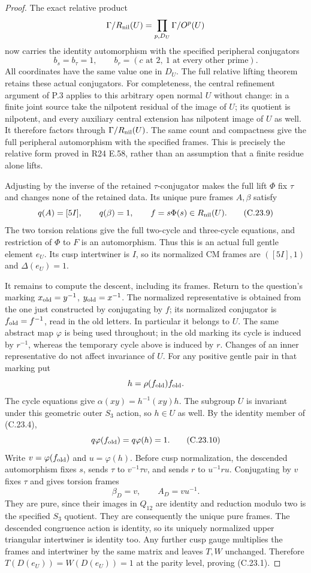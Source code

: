 \begin{proof}
The exact relative product
\[
 \Gamma/R_{\rm nil}(U)
       =\prod_{p,D_U}\Gamma/O^p(U)
\]
now carries the identity automorphism with the
specified peripheral conjugators
\[
 b_s=b_\tau=1,\qquad
 b_r=(c\text{ at }2,\ 1\text{ at every other prime}).
 \tag{C.23.8}
\]
All coordinates have the same value one in $D_U$.
The full relative lifting theorem retains these
actual conjugators. For completeness, the central
refinement argument of P.3 applies to this arbitrary
open normal $U$ without change: in a finite joint
source take the nilpotent residual of the image of
$U$; its quotient is nilpotent, and every auxiliary
central extension has nilpotent image of $U$ as
well. It therefore factors through
$\Gamma/R_{\rm nil}(U)$. The same count and
compactness give the full peripheral automorphism
with the specified frames. This is precisely the
relative form proved in R24 E.58, rather than an
assumption that a finite residue alone lifts.

Adjusting by the inverse of the retained
$\tau$-conjugator makes the full lift $\Phi$
fix $\tau$ and changes none of the retained data.
Its unique pure frames $A,\beta$ satisfy
\[
       q(A)=[5I],\qquad q(\beta)=1,
       \qquad f=s\Phi(s)\in R_{\rm nil}(U).
 \tag{C.23.9}
\]
The two torsion relations give the full two-cycle
and three-cycle equations, and restriction of
$\Phi$ to $F$ is an automorphism. Thus this is
an actual full gentle element $e_U$. Its cusp
intertwiner is $I$, so its normalized CM frames
are $([5I],1)$ and $\Delta(e_U)=1$.

It remains to compute the descent, including its
frames. Return to the question's marking
$x_{\rm old}=y^{-1}$, $y_{\rm old}=x^{-1}$.
The normalized representative is obtained from the
one just constructed by conjugating by $f$;
its normalized conjugator is $f_{\rm old}=f^{-1}$,
read in the old letters. In particular it belongs
to $U$. The same abstract map $\varphi$ is being
used throughout; in the old marking its cycle is
induced by $r^{-1}$, whereas the temporary cycle
above is induced by $r$. Changes of an inner
representative do not affect invariance of $U$.
For any positive gentle pair in that marking
put
\[
                  h=\rho(f_{\rm old})f_{\rm old}.
\]
The cycle equations give
$\alpha(xy)=h^{-1}(xy)h$. The subgroup $U$ is
invariant under this geometric outer $S_3$ action,
so $h\in U$ as well. By the identity member of
(C.23.4),
\[
       q\varphi(f_{\rm old})=q\varphi(h)=1.
 \tag{C.23.10}
\]
Write $v=\varphi(f_{\rm old})$ and
$u=\varphi(h)$. Before cusp normalization, the
descended automorphism fixes $s$, sends
$\tau$ to $v^{-1}\tau v$, and sends
$r$ to $u^{-1}ru$. Conjugating by $v$ fixes
$\tau$ and gives torsion frames
\[
                         \beta_D=v,
                 \qquad A_D=vu^{-1}.
\]
They are pure, since their images in $Q_{12}$
are identity and reduction modulo two is the
specified $S_3$ quotient. They are consequently
the unique pure frames. The descended congruence
action is identity, so its uniquely normalized
upper triangular intertwiner is identity too.
Any further cusp gauge multiplies the frames and
intertwiner by the same matrix and leaves $T,W$
unchanged. Therefore $T(D(e_U))=W(D(e_U))=1$
at the parity level, proving (C.23.1).


\end{proof}
